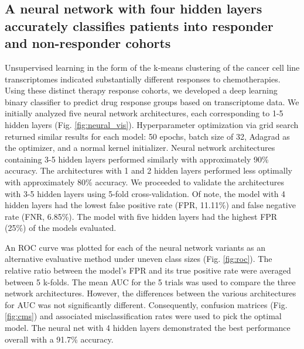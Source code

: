 \documentclass[10pt, letterpaper]{article}
\begin{document}
\begin{multicols*}{2}
\subsection{A neural network with four hidden layers accurately classifies patients into responder and non-responder cohorts}
Unsupervised learning in the form of the k-means clustering of the cancer cell line transcriptomes indicated substantially different responses to chemotherapies. Using these distinct therapy response cohorts, we developed a deep learning binary classifier to predict drug response groups based on transcriptome data. We initially analyzed five neural network architectures, each corresponding to 1-5 hidden layers (Fig. \ref{fig:neural_vis}). Hyperparameter optimization via grid search returned similar results for each model: 50 epochs, batch size of 32, Adagrad as the optimizer, and a normal kernel initializer. Neural network architectures containing 3-5 hidden layers performed similarly with approximately 90\% accuracy. The architectures with 1 and 2 hidden layers performed less optimally with approximately 80\% accuracy. We proceeded to validate the architectures with 3-5 hidden layers using 5-fold cross-validation. Of note, the model with 4 hidden layers had the lowest false positive rate (FPR, 11.11\%) and false negative rate (FNR, 6.85\%). The model with five hidden layers had the highest FPR (25\%) of the models evaluated.

An ROC curve was plotted for each of the neural network variants as an alternative evaluative method under uneven class sizes (Fig. \ref{fig:roc}). The relative ratio between the model’s FPR and its true positive rate were averaged between 5 k-folds. The mean AUC for the 5 trials was used to compare the three network architectures. However, the differences between the various architectures for AUC was not significantly different. Consequently, confusion matrices (Fig. \ref{fig:cms}) and associated misclassification rates were used to pick the optimal model. The neural net with 4 hidden layers demonstrated the best performance overall with a 91.7\% accuracy.



\end{multicols*}
\end{document}
